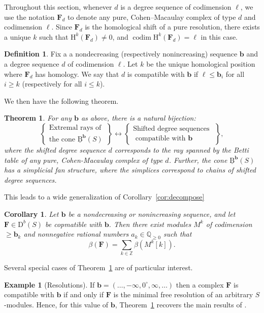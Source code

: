 \documentclass[12pt]{amsart}
\newtheorem{cor}[lemma]{Corollary}
\newtheorem{thm}[lemma]{Theorem}
\theoremstyle{definition}
\newtheorem{example}[lemma]{Example}
\newtheorem{defn}[lemma]{Definition}
\theoremstyle{remark}
\newcommand{\codim}{\operatorname{codim}}
\newcommand{\HH}{\mathrm{H}}
\newcommand{\ZZ}{\mathbb{Z}}
\newcommand{\QQ}{\mathbb{Q}}
\newcommand{\bb}{\mathbf{b}}
\newcommand{\FF}{\mathbf{F}}
\newcommand{\defi}[1]{\textsf{#1}} %
\newcommand{\zp}{\circ}
\newcommand{\DD}{\mathrm{D}}
\newcommand{\BBQ}{\underline{\mathrm{B}}}
\begin{document}
Throughout this section, whenever $d$ is a degree sequence of codimension $\ell$, we use the notation $\FF_d$ to denote any pure, Cohen--Macaulay complex of type $d$ and codimension $\ell$. 
Since $\FF_d$ is the homological shift of a pure resolution, there exists a unique $k$ such that $\HH^k(\FF_d)\ne 0$, and $\codim \HH^k(\FF_d)=\ell$ in this case.  

\begin{defn}\label{defn:deg compatible}
Fix a a nondecreasing (respectively nonincreasing) sequence $\bb$ and a degree sequence $d$ of codimension $\ell$.  Let $k$ be the unique homological position where $\FF_d$ has homology.  We say that $d$ is \defi{compatible with $\bb$} if $\ell\leq \bb_i$ for all $i\geq k$ (respectively for all $i\leq k$).
\end{defn}


We then have the following theorem.
\begin{thm}\label{thm:extremal rays refined}
For any $\bb$ as above, there is a natural bijection:
\[
\left\{
\begin{matrix}
\text{Extremal rays of }\\
\text{the cone } \BBQ^{\bb}(S)
\end{matrix}
\right\}
\longleftrightarrow
\left\{
\begin{matrix}
\text{Shifted degree sequences }\\
\text{ compatible with $\bb$}
\end{matrix}
\right\},
\]
where the shifted degree sequence $d$ corresponds to the ray spanned by the Betti table of any pure, Cohen-Macaulay complex of type $d$. Further, the cone $\BBQ^{\bb}(S)$ has a simplicial fan structure, where the simplices correspond to chains of shifted degree sequences.
\end{thm}


This leads to a wide generalization of Corollary~\ref{cor:decompose}
\begin{cor}\label{cor:decompose refined}
Let $\bb$ be a nondecreasing or nonincreasing sequence, and let $\FF\in \DD^b(S)$ be copmatible with $\bb$.  Then there exist modules $M^k$ of codimension $\geq \bb_k$ and nonnegative rational numbers $a_k\in \QQ_{\geq 0}$ such that
\[
\beta(\FF)=\sum_{k\in \ZZ} \beta(M^k[k]).
\]
\end{cor}

Several special cases of Theorem~\ref{thm:extremal rays refined} are of particular interest.
\begin{example}[Resolutions]\label{ex:resolutions}
%
If $\bb=(\dots, -\infty, 0^\zp, \infty, \dots)$ then a complex $\FF$ is compatible with $\bb$ if and only if $\FF$ is the minimal free resolution of an arbitrary $S$-modules.  Hence, for this value of $\bb$, Theorem~\ref{thm:extremal rays refined} recovers the main results of \cite{boij-sod2}.
\end{example}
\end{document}
